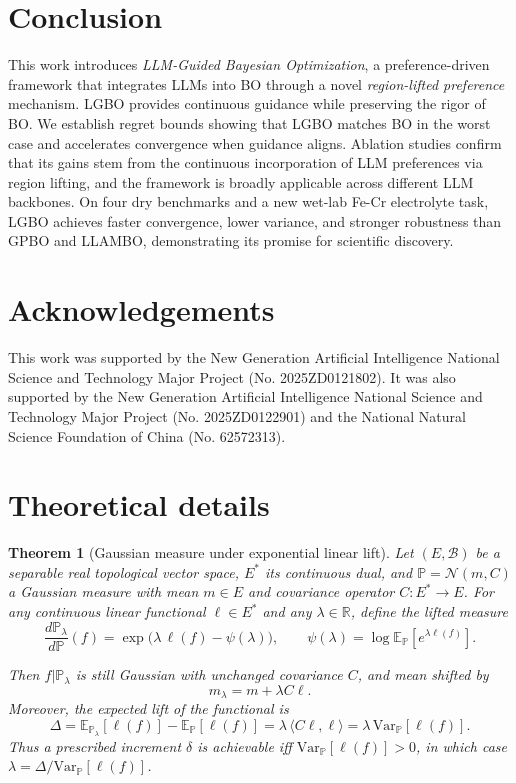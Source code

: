 \documentclass{article} %
\newtheorem{theorem}{Theorem}
\begin{document}
    \section{Conclusion}
This work introduces \emph{LLM-Guided Bayesian Optimization}, a preference-driven framework that integrates LLMs into BO through a novel \emph{region-lifted preference} mechanism. LGBO provides continuous guidance while preserving the rigor of BO. We establish regret bounds showing that LGBO matches BO in the worst case and accelerates convergence when guidance aligns. Ablation studies confirm that its gains stem from the continuous incorporation of LLM preferences via region lifting, and the framework is broadly applicable across different LLM backbones. On four dry benchmarks and a new wet-lab Fe-Cr electrolyte task, LGBO achieves faster convergence, lower variance, and stronger robustness than GPBO and LLAMBO, demonstrating its promise for scientific discovery.
\section*{Acknowledgements}
This work was supported by the New Generation Artificial Intelligence National Science and Technology Major Project (No. 2025ZD0121802). It was also supported by the New Generation Artificial Intelligence National Science and Technology Major Project (No. 2025ZD0122901) and the National Natural Science Foundation of China (No. 62572313).


\newpage
\appendix
\section{Theoretical details}\label{app:the}
\begin{theorem}[Gaussian measure under exponential linear lift]\label{app:the2}
 Let $(E,\mathcal B)$ be a separable real topological vector space, $E^*$ its continuous dual, and $\mathbb P=\mathcal N(m,C)$ a Gaussian measure with mean $m\in E$ and covariance operator $C:E^*\to E$.  
For any continuous linear functional $\ell\in E^*$ and any $\lambda\in\mathbb R$, define the lifted measure
\[
\frac{d\mathbb P_\lambda}{d\mathbb P}(f)
= \exp\!\big(\lambda\,\ell(f)-\psi(\lambda)\big),\qquad
\psi(\lambda)=\log\mathbb E_\mathbb P[e^{\lambda \ell(f)}].
\]

Then $f|\mathbb P_\lambda$ is still Gaussian with unchanged covariance $C$, and mean shifted by
\[
m_\lambda = m + \lambda C\ell.
\]
Moreover, the expected lift of the functional is
\[
\Delta = \mathbb E_{\mathbb P_\lambda}[\ell(f)] - \mathbb E_\mathbb P[\ell(f)]
= \lambda\,\langle C\ell,\ell\rangle
= \lambda\,\mathrm{Var}_\mathbb P[\ell(f)].
\]
Thus a prescribed increment $\delta$ is achievable iff $\mathrm{Var}_\mathbb P[\ell(f)]>0$, in which case $\lambda=\Delta/\mathrm{Var}_\mathbb P[\ell(f)]$.
\end{theorem}
\end{document}
